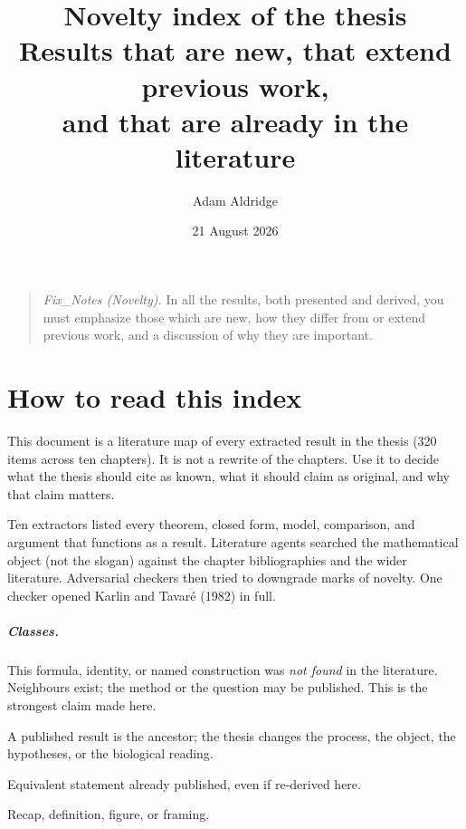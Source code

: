 \documentclass[11pt,a4paper]{report}
\title{\textbf{Novelty index of the thesis}\\[6pt]
\large Results that are new, that extend previous work,\\
and that are already in the literature}
\author{Adam Aldridge}
\date{21 August 2026}
\newcommand{\cls}[1]{\textsc{#1}}
\newcommand{\orig}{\cls{Original}}
\newcommand{\ext}{\cls{Extends}}
\newcommand{\alr}{\cls{Already}}
\newcommand{\nar}{\cls{Not a result}}
\begin{document}
\hypersetup{pageanchor=false}
\maketitle
\hypersetup{pageanchor=true}

\begin{quote}
\small
\noindent\textit{Fix\_Notes (Novelty).}
In all the results, both presented and derived, you must emphasize those
which are new, how they differ from or extend previous work, and a
discussion of why they are important.
\end{quote}

\tableofcontents
\clearpage

\chapter{How to read this index}
\label{ch:how}

This document is a literature map of every extracted result in the thesis
(320 items across ten chapters). It is not a rewrite of the chapters. Use
it to decide what the thesis should cite as known, what it should claim as
original, and why that claim matters.

Ten extractors listed every theorem, closed form, model, comparison, and
argument that functions as a result. Literature agents searched the
mathematical object (not the slogan) against the chapter bibliographies
and the wider literature. Adversarial checkers then tried to downgrade
marks of novelty. One checker opened Karlin and Tavar\'e (1982) in full.

\paragraph{Classes.}
\begin{description}[style=nextline,leftmargin=2.2cm,labelwidth=2.0cm]
\item[\orig]
This formula, identity, or named construction was \emph{not found} in the
literature. Neighbours exist; the method or the question may be published.
This is the strongest claim made here.
\item[\ext]
A published result is the ancestor; the thesis changes the process, the
object, the hypotheses, or the biological reading.
\item[\alr]
Equivalent statement already published, even if re-derived here.
\item[\nar]
Recap, definition, figure, or framing.
\end{description}
\end{document}
